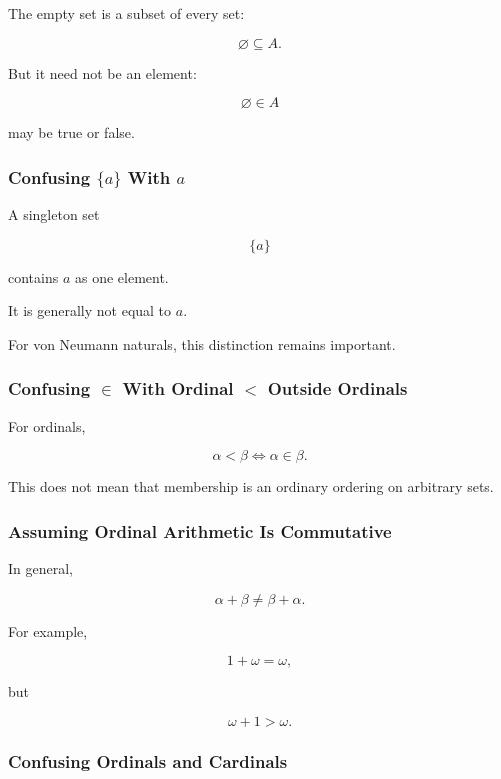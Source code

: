 The empty set is a subset of every set:

\[
\boxed{
\varnothing\subseteq A.
}
\]

But it need not be an element:

\[
\boxed{
\varnothing\in A
}
\]

may be true or false.

\subsubsection{Confusing \(\{a\}\) With \(a\)}

A singleton set

\[
\{a\}
\]

contains \(a\) as one element.

It is generally not equal to \(a\).

For von Neumann naturals, this distinction remains important.

\subsubsection{Confusing \(\in\) With Ordinal \(<\) Outside Ordinals}

For ordinals,

\[
\alpha<\beta
\iff
\alpha\in\beta.
\]

This does not mean that membership is an ordinary ordering on arbitrary
sets.

\subsubsection{Assuming Ordinal Arithmetic Is Commutative}

In general,

\[
\boxed{
\alpha+\beta
\neq
\beta+\alpha.
}
\]

For example,

\[
1+\omega=\omega,
\]

but

\[
\omega+1>\omega.
\]

\subsubsection{Confusing Ordinals and Cardinals}

